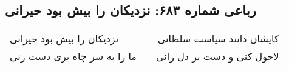 \begin{center}
\section*{رباعی شماره ۶۸۳: نزدیکان را بیش بود حیرانی}
\label{sec:sh683}
\begin{longtable}{l p{0.5cm} r}
نزدیکان را بیش بود حیرانی
&&
کایشان دانند سیاست سلطانی
\\
ما را به سر چاه بری دست زنی
&&
لاحول کنی و دست بر دل رانی
\\
\end{longtable}
\end{center}
